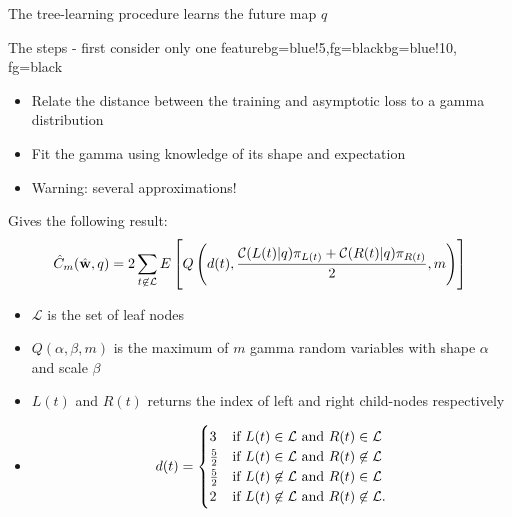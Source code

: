 \begin{frame}{The tree-learning procedure learns the future map $q$}
	\begin{myblock}{The steps - first consider only one feature}{bg=blue!5,fg=black}{bg=blue!10, fg=black}
	\begin{itemize}
		\item<1-> Relate the distance between the training and asymptotic loss to a gamma distribution
		\item<1-> Fit the gamma using knowledge of its shape and expectation
	\end{itemize}
	\end{myblock}
\begin{itemize}
	\item<2-> Warning: several approximations!
\end{itemize}
\end{frame}

\begin{frame}{Gives the following result:}
	\begin{align*}
	\hat{C}_m(\hat{\mathbf{w}}, q) 
	=
	2 \sum_{t\not\in \mathcal{L}} E \left[
	Q\left(
	d(t), \frac{ \mathcal{C}(L(t)|q)\pi_{L(t)} + \mathcal{C}(R(t)|q)\pi_{R(t)} }{2}, m
	\right)
	\right]
	\end{align*}
	\begin{itemize}
		\item $\mathcal{L}$ is the set of leaf nodes
		\item $Q(\alpha,\beta,m)$ is the maximum of $m$ gamma random variables with shape $\alpha$ and scale $\beta$
		\item $L(t)$ and $R(t)$ returns the index of left and right child-nodes respectively
		\item 	\small\begin{align*}
		d(t) = 
		\begin{cases}
		3 & \text{if } L(t) \in \mathcal{L} \text{ and } R(t) \in \mathcal{L}\\
		\frac{5}{2} & \text{if } L(t) \in \mathcal{L} \text{ and } R(t) \not\in \mathcal{L}\\
		\frac{5}{2} & \text{if } L(t) \not\in \mathcal{L} \text{ and } R(t) \in \mathcal{L}\\
		2 & \text{if } L(t) \not\in \mathcal{L} \text{ and } R(t) \not\in \mathcal{L}.
		\end{cases}
		\end{align*} 
	\end{itemize}
\end{frame}


